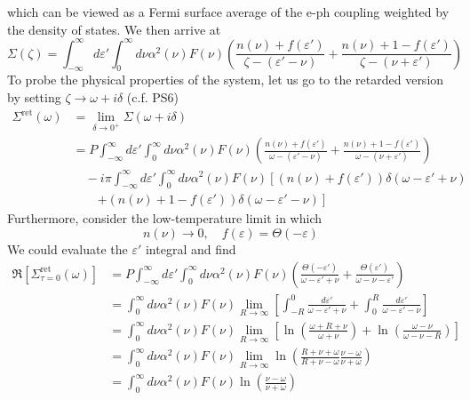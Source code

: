 which can be viewed as a Fermi surface average of the e-ph coupling weighted by the density of states. We then arrive at
\[ \Sigma \left( \zeta \right) =\int_{-\infty}^{\infty}{d\varepsilon '\int_0^{\infty}{d\nu \alpha ^2\left( \nu \right) F\left( \nu \right) \left( \frac{n\left( \nu \right) +f\left( \varepsilon ' \right)}{\zeta -\left( \varepsilon '-\nu \right)}+\frac{n\left( \nu \right) +1-f\left( \varepsilon ' \right)}{\zeta -\left( \nu +\varepsilon ' \right)} \right)}}\]
To probe the physical properties of the system, let us go to the retarded version by setting $\zeta \rightarrow \omega +i\delta$ (c.f. PS6)
\begin{align*}
    \Sigma ^{\mathrm{ret}}\left( \omega \right) &=\lim_{\delta \rightarrow 0^+} \Sigma \left( \omega +i\delta \right) \\
    &=P\int_{-\infty}^{\infty}{d\varepsilon '\int_0^{\infty}{d\nu \alpha ^2\left( \nu \right) F\left( \nu \right) \left( \frac{n\left( \nu \right) +f\left( \varepsilon ' \right)}{\omega -\left( \varepsilon '-\nu \right)}+\frac{n\left( \nu \right) +1-f\left( \varepsilon ' \right)}{\omega -\left( \nu +\varepsilon ' \right)} \right)}}\\
    &\quad -i\pi \int_{-\infty}^{\infty}{d\varepsilon '\int_0^{\infty}{d\nu \alpha ^2\left( \nu \right) F\left( \nu \right) \left[ \left( n\left( \nu \right) +f\left( \varepsilon ' \right) \right) \delta \left( \omega -\varepsilon '+\nu \right) \right.}}\\
    &\quad \quad \left. +\left( n\left( \nu \right) +1-f\left( \varepsilon ' \right) \right) \delta \left( \omega -\varepsilon '-\nu \right) \right]
\end{align*}
Furthermore, consider the low-temperature limit in which
\[ n\left( \nu \right) \rightarrow 0,\quad f\left( \varepsilon \right) =\Theta \left( -\varepsilon \right) \]
We could evaluate the $\varepsilon'$ integral and find
\begin{align*}
    \Re \left[ \Sigma _{\tau =0}^{\mathrm{ret}}\left( \omega \right) \right] &=P\int_{-\infty}^{\infty}{d\varepsilon '\int_0^{\infty}{d\nu \alpha ^2\left( \nu \right) F\left( \nu \right) \left( \frac{\Theta \left( -\varepsilon ' \right)}{\omega -\varepsilon '+\nu}+\frac{\Theta \left( \varepsilon ' \right)}{\omega -\nu -\varepsilon '} \right)}}\\
    &=\int_0^{\infty}{d\nu \alpha ^2\left( \nu \right) F\left( \nu \right) \lim_{R\rightarrow \infty} \left[ \int_{-R}^0{\frac{d\varepsilon '}{\omega -\varepsilon '+\nu}}+\int_0^R{\frac{d\varepsilon '}{\omega -\varepsilon '-\nu}} \right]}\\
    &=\int_0^{\infty}{d\nu \alpha ^2\left( \nu \right) F\left( \nu \right) \lim_{R\rightarrow \infty} \left[ \ln \left( \frac{\omega +R+\nu}{\omega +\nu} \right) +\ln \left( \frac{\omega -\nu}{\omega -\nu -R} \right) \right]}\\
    &=\int_0^{\infty}{d\nu \alpha ^2\left( \nu \right) F\left( \nu \right) \lim_{R\rightarrow \infty} \ln \left( \frac{R+\nu +\omega}{R+\nu -\omega}\frac{\nu -\omega}{\nu +\omega} \right)}\\
    &=\int_0^{\infty}{d\nu \alpha ^2\left( \nu \right) F\left( \nu \right) \ln \left( \frac{\nu -\omega}{\nu +\omega} \right)}
\end{align*}
